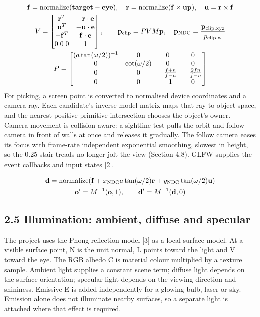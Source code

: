\documentclass[12pt,a4paper]{article}
\begin{document}
{\small\begin{equation}\begin{gathered}
\mathbf f=\operatorname{normalize}(\mathbf{target}-\mathbf{eye}),\quad
\mathbf r=\operatorname{normalize}(\mathbf f\times\mathbf{up}),\quad\mathbf u=\mathbf r\times\mathbf f\\
V=\begin{bmatrix}\mathbf r^T&-\mathbf r\cdot\mathbf e\\\mathbf u^T&-\mathbf u\cdot\mathbf e\\-\mathbf f^T&\mathbf f\cdot\mathbf e\\0\;0\;0&1\end{bmatrix},\qquad
\mathbf p_{\rm clip}=PVM\mathbf p,\quad \mathbf p_{\rm NDC}=\frac{\mathbf p_{\rm clip,xyz}}{p_{\rm clip,w}}\\
P=\begin{bmatrix}(a\tan(\omega/2))^{-1}&0&0&0\\0&\cot(\omega/2)&0&0\\0&0&-\frac{f+n}{f-n}&-\frac{2fn}{f-n}\\0&0&-1&0\end{bmatrix}
\end{gathered}\label{eq:7}\end{equation}}
For picking, a screen point is converted to normalised device coordinates and a camera ray. Each candidate's inverse model matrix maps that ray to object space, and the nearest positive primitive intersection chooses the object's owner. Camera movement is collision-aware: a sightline test pulls the orbit and follow camera in front of walls at once and releases it gradually. The follow camera eases its focus with frame-rate independent exponential smoothing, slowest in height, so the 0.25 stair treads no longer jolt the view (Section 4.8). GLFW supplies the event callbacks and input states [2].

{\small\begin{equation}\begin{gathered}
\mathbf d=\operatorname{normalize}\!\left(\mathbf f+x_{\rm NDC}a\tan(\omega/2)\mathbf r+y_{\rm NDC}\tan(\omega/2)\mathbf u\right)\\
\mathbf o'=M^{-1}(\mathbf o,1),\qquad \mathbf d'=M^{-1}(\mathbf d,0)
\end{gathered}\label{eq:8}\end{equation}}
\subsection*{2.5 Illumination: ambient, diffuse and specular}
The project uses the Phong reflection model [3] as a local surface model. At a visible surface point, N is the unit normal, L points toward the light and V toward the eye. The RGB albedo C is material colour multiplied by a texture sample. Ambient light supplies a constant scene term; diffuse light depends on the surface orientation; specular light depends on the viewing direction and shininess. Emissive E is added independently for a glowing bulb, laser or sky. Emission alone does not illuminate nearby surfaces, so a separate light is attached where that effect is required.
\end{document}
